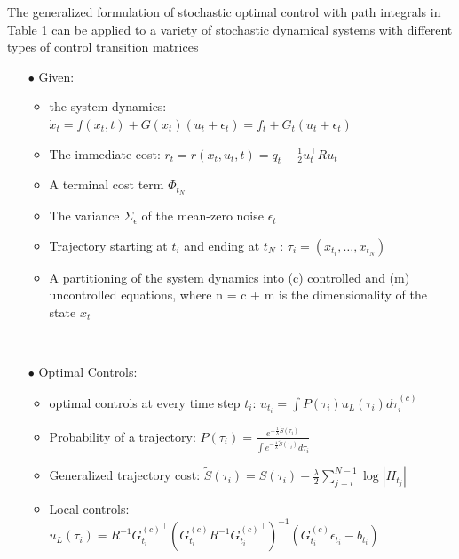 \documentclass[journal]{IEEEtran}
\begin{document}
The generalized formulation of stochastic optimal control with path integrals in Table 1 can be
applied to a variety of stochastic dynamical systems with different types of control transition matrices

\begin{table}
 \caption{}
 \label{table 1}
  \begin{itemize}
    \item[$\bullet$] Given: 
    \begin{itemize}
      
      \item the system dynamics: $\dot{x}_t = f(x_t,t)+G(x_t)(u_t +\epsilon_t) = f_t +G_t (u_t +\epsilon_t)$
      \ \\
      \item The immediate cost: $r_t = r(x_t,u_t,t) = q_t + \frac{1}{2} u_t^{\top} R u_t$
      \ \\
      \item A terminal cost term $\Phi_{t_N}$
      \ \\
      \item The variance $\Sigma_{\epsilon}$ of the mean-zero noise $\epsilon_t$
      \ \\
      \item Trajectory starting at $t_i$ and ending at $t_N$ : $\tau_i =(x_{t_i}, \ldots ,x_{t_N})$
      \ \\
      \item A partitioning of the system dynamics into (c) controlled and (m) uncontrolled equations, where n = c + m is the dimensionality of the state $x_t$ 
    \end{itemize}  
     \ \\
    \item[$\bullet$] Optimal Controls:
    \begin{itemize}
      
      \item optimal controls at every time step $t_i$: $u_{t_i} = \int P(\tau_i) u_L(\tau_i) d\tau_i^{(c)}  $
      \ \\
      \item Probability of a trajectory: $P(\tau_i) = \frac{e^{-\frac{1}{\lambda}\tilde{S}(\tau_i)}  }{\int e^{-\frac{1}{\lambda}\tilde{S}(\tau_i)}d\tau_i}$ 
      \ \\
      \item Generalized trajectory cost: $\tilde{S}(\tau_i) = S(\tau_i) + \frac{\lambda}{2} \sum_{j = i}^{N-1} \log |H_{t_j}|$
       \ \\
      \item Local controls: $u_L(\tau_i) = R^{-1} {G_{t_i}^{(c)}}^{\top} ({G_{t_i}^{(c)}} R^{-1} {G_{t_i}^{(c)}}^{\top})^{-1}(G_{t_i}^{(c)}\epsilon_{t_i} - b_{t_i})$
    \end{itemize} 
  \end{itemize}

\end{table}
\end{document}
